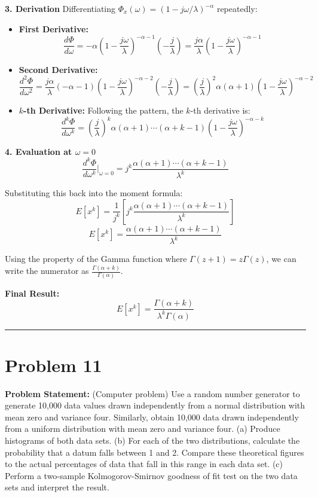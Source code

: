 \documentclass{article}
\begin{document}
\textbf{3. Derivation}
Differentiating $\Phi_x(\omega) = (1 - j\omega/\lambda)^{-\alpha}$ repeatedly:
\begin{itemize}
	\item \textbf{First Derivative:}
	      \[ \frac{d\Phi}{d\omega} = -\alpha \left( 1 - \frac{j\omega}{\lambda} \right)^{-\alpha-1} \left( -\frac{j}{\lambda} \right) = \frac{j\alpha}{\lambda} \left( 1 - \frac{j\omega}{\lambda} \right)^{-\alpha-1} \]

	\item \textbf{Second Derivative:}
	      \[ \frac{d^2\Phi}{d\omega^2} = \frac{j\alpha}{\lambda} (-\alpha-1) \left( 1 - \frac{j\omega}{\lambda} \right)^{-\alpha-2} \left( -\frac{j}{\lambda} \right) = \left(\frac{j}{\lambda}\right)^2 \alpha(\alpha+1) \left( 1 - \frac{j\omega}{\lambda} \right)^{-\alpha-2} \]

	\item \textbf{$k$-th Derivative:}
	      Following the pattern, the $k$-th derivative is:
	      \[ \frac{d^k\Phi}{d\omega^k} = \left(\frac{j}{\lambda}\right)^k \alpha(\alpha+1)\cdots(\alpha+k-1) \left( 1 - \frac{j\omega}{\lambda} \right)^{-\alpha-k} \]
\end{itemize}

\textbf{4. Evaluation at $\omega=0$}
\[ \frac{d^k\Phi}{d\omega^k} \bigg|_{\omega=0} = j^k \frac{\alpha(\alpha+1)\cdots(\alpha+k-1)}{\lambda^k} \]

Substituting this back into the moment formula:
\[ E[x^k] = \frac{1}{j^k} \left[ j^k \frac{\alpha(\alpha+1)\cdots(\alpha+k-1)}{\lambda^k} \right] \]
\[ E[x^k] = \frac{\alpha(\alpha+1)\cdots(\alpha+k-1)}{\lambda^k} \]

Using the property of the Gamma function where $\Gamma(z+1) = z\Gamma(z)$, we can write the numerator as
$\frac{\Gamma(\alpha+k)}{\Gamma(\alpha)}$.

\textbf{Final Result:}
\[ E[x^k] = \frac{\Gamma(\alpha+k)}{\lambda^k \Gamma(\alpha)} \]

\vspace{1cm}
\hrule
\vspace{1cm}

\section*{Problem 11}

\textbf{Problem Statement:}
(Computer problem) Use a random number generator to generate 10,000 data values drawn independently from a normal distribution with mean zero and variance four. Similarly, obtain 10,000 data drawn independently from a uniform distribution with mean zero and variance four.
(a) Produce histograms of both data sets.
(b) For each of the two distributions, calculate the probability that a datum falls between 1 and 2. Compare these theoretical figures to the actual percentages of data that fall in this range in each data set.
(c) Perform a two-sample Kolmogorov-Smirnov goodness of fit test on the two data sets and interpret the result.
\end{document}
